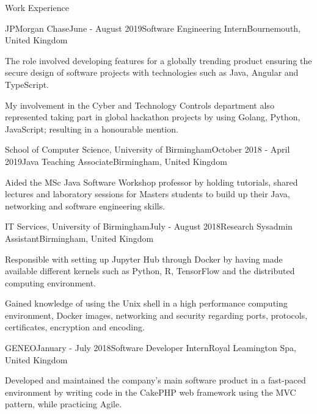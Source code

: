 \documentclass{resume} %
\begin{document}
\begin{rSection}{Work Experience}

\begin{rSubsection}{JPMorgan Chase}{June - August 2019}{Software Engineering Intern}{Bournemouth, United Kingdom}
\item The role involved developing features for a globally trending product ensuring the secure design of software projects with technologies such as Java, Angular and TypeScript.
\item My involvement in the Cyber and Technology Controls department also represented taking part in global hackathon projects by using Golang, Python, JavaScript; resulting in a honourable mention.
\end{rSubsection}

\begin{rSubsection}{School of Computer Science, University of Birmingham}{October 2018 - April 2019}{Java Teaching Associate}{Birmingham, United Kingdom}
\item Aided the MSc Java Software Workshop professor by holding tutorials, shared lectures and laboratory sessions for Masters students to build up their Java, networking and software engineering skills.
\end{rSubsection}

\begin{rSubsection}{IT Services, University of Birmingham}{July - August 2018}{Research Sysadmin Assistant}{Birmingham, United Kingdom}
\item Responsible with setting up Jupyter Hub through Docker by having made available different kernels such as Python, R, TensorFlow and the distributed computing environment.
\item Gained knowledge of using the Unix shell in a high performance computing environment, Docker images, networking and security regarding ports, protocols, certificates, encryption and encoding.
\end{rSubsection}

\begin{rSubsection}{GENEO}{January - July 2018}{Software Developer Intern}{Royal Leamington Spa, United Kingdom}
\item Developed and maintained the company’s main software product in a fast-paced environment by writing code in the CakePHP web framework using the MVC pattern, while practicing Agile.
\end{rSubsection}


\end{rSection}
\end{document}
